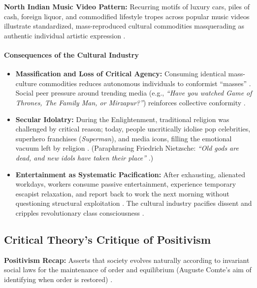 \begin{ExampleBox}
\textbf{North Indian Music Video Pattern:} Recurring motifs of luxury cars, piles of cash, foreign liquor, and commodified lifestyle tropes across popular music videos illustrate standardized, mass-reproduced cultural commodities masquerading as authentic individual artistic expression .
\end{ExampleBox}

\paragraph{Consequences of the Cultural Industry}
\begin{itemize}
    \item \textbf{Massification and Loss of Critical Agency:} Consuming identical mass-culture commodities reduces autonomous individuals to conformist ``masses'' . Social peer pressure around trending media (e.g., \textit{``Have you watched Game of Thrones, The Family Man, or Mirzapur?''}) reinforces collective conformity .
    \item \textbf{Secular Idolatry:} During the Enlightenment, traditional religion was challenged by critical reason; today, people uncritically idolise pop celebrities, superhero franchises (\textit{Superman}), and media icons, filling the emotional vacuum left by religion . (Paraphrasing Friedrich Nietzsche: \textit{``Old gods are dead, and new idols have taken their place''} .)
    \item \textbf{Entertainment as Systematic Pacification:} After exhausting, alienated workdays, workers consume passive entertainment, experience temporary escapist relaxation, and report back to work the next morning without questioning structural exploitation . The cultural industry pacifies dissent and cripples revolutionary class consciousness .
\end{itemize}

\subsection{Critical Theory's Critique of Positivism}

\begin{KeyConcept}
\textbf{Positivism Recap:} Asserts that society evolves naturally according to invariant social laws for the maintenance of order and equilibrium (Auguste Comte's aim of identifying when order is restored) .
\end{KeyConcept}

